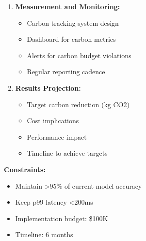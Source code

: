 \begin{exercise}
\begin{enumerate}
    \item \textbf{Measurement and Monitoring:}
    \begin{itemize}
        \item Carbon tracking system design
        \item Dashboard for carbon metrics
        \item Alerts for carbon budget violations
        \item Regular reporting cadence
    \end{itemize}

    \item \textbf{Results Projection:}
    \begin{itemize}
        \item Target carbon reduction (kg CO2)
        \item Cost implications
        \item Performance impact
        \item Timeline to achieve targets
    \end{itemize}
\end{enumerate}

\textbf{Constraints:}
\begin{itemize}
    \item Maintain >95\% of current model accuracy
    \item Keep p99 latency <200ms
    \item Implementation budget: \$100K
    \item Timeline: 6 months
\end{itemize}
\end{exercise}

